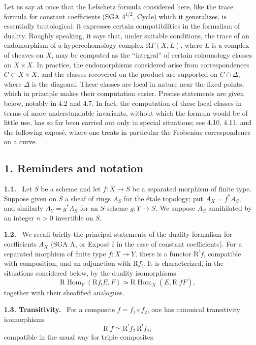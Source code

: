 \documentclass[11pt]{article}
\theoremstyle{plain}
\theoremstyle{definition}
\theoremstyle{remark}
\newenvironment{statement}[1]{\par\medskip\noindent\textbf{#1.}\ }{\par\medskip}
\DeclareMathOperator{\Hom}{Hom}
\newcommand{\R}{\mathrm R}
\begin{document}
Let us say at once that the Lefschetz formula considered here, like the trace formula for constant coefficients (SGA $4^{1/2}$, Cycle) which it generalizes, is essentially tautological: it expresses certain compatibilities in the formalism of duality. Roughly speaking, it says that, under suitable conditions, the trace of an endomorphism of a hypercohomology complex $\R\Gamma(X,L)$, where $L$ is a complex of sheaves on $X$, may be computed as the ``integral'' of certain cohomology classes on $X\times X$. In practice, the endomorphisms considered arise from correspondences $C\subset X\times X$, and the classes recovered on the product are supported on $C\cap\Delta$, where $\Delta$ is the diagonal. These classes are local in nature near the fixed points, which in principle makes their computation easier. Precise statements are given below, notably in 4.2 and 4.7. In fact, the computation of these local classes in terms of more understandable invariants, without which the formula would be of little use, has so far been carried out only in special situations; see 4.10, 4.11, and the following exposé, where one treats in particular the Frobenius correspondence on a curve.

\subsection*{1. Reminders and notation}

\begin{statement}{1.1}
Let $S$ be a scheme and let $f:X\to S$ be a separated morphism of finite type. Suppose given on $S$ a sheaf of rings $A_S$ for the étale topology; put $A_X=f^*A_S$, and similarly $A_Y=g^*A_S$ for an $S$-scheme $g:Y\to S$. We suppose $A_S$ annihilated by an integer $n>0$ invertible on $S$.
\end{statement}

\begin{statement}{1.2}
We recall briefly the principal statements of the duality formalism for coefficients $A_X$ (SGA A, or Exposé I in the case of constant coefficients). For a separated morphism of finite type $f:X\to Y$, there is a functor $\R^!f$, compatible with composition, and an adjunction with $\R f_!$. It is characterized, in the situations considered below, by the duality isomorphisms
\[
   \R\Hom_Y(\R f_!E,F)\simeq \R\Hom_X(E,\R^!fF),
\]
together with their sheafified analogues.
\end{statement}

\begin{statement}{1.3. Transitivity}
For a composite $f=f_1\circ f_2$, one has canonical transitivity isomorphisms
\[
   \R^!f\simeq \R^!f_2\,\R^!f_1,
\]
compatible in the usual way for triple composites.
\end{statement}
\end{document}
